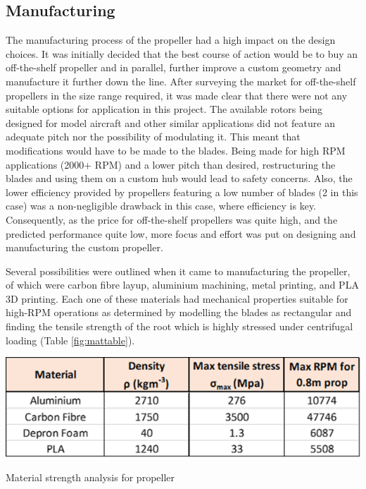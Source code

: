 \subsection{Manufacturing}

The manufacturing process of the propeller had a high impact on the design choices. It was initially decided that the best course of action would be to buy an off-the-shelf propeller and in parallel, further improve a custom geometry and manufacture it further down the line. After surveying the market for off-the-shelf propellers in the size range required, it was made clear that there were not any suitable options for application in this project. The available rotors being designed for model aircraft and other similar applications did not feature an adequate pitch nor the possibility of modulating it. This meant that modifications would have to be made to the blades. Being made for high RPM applications (2000+ RPM) and a lower pitch than desired, restructuring the blades and using them on a custom hub would lead to safety concerns. Also, the lower efficiency provided by propellers featuring a low number of blades (2 in this case) was a non-negligible drawback in this case, where efficiency is key. Consequently, as the price for off-the-shelf propellers was quite high, and the predicted performance quite low, more focus and effort was put on designing and manufacturing the custom propeller.

Several possibilities were outlined when it came to manufacturing the propeller, of which were carbon fibre layup, aluminium machining, metal printing, and PLA 3D printing. Each one of these materials had mechanical properties suitable for high-RPM operations as determined by modelling the blades as rectangular and finding the tensile strength of the root which is highly stressed under centrifugal loading (Table \ref{fig:mattable}).

\begin{table}[!htbp]
    \centering
    \includegraphics{images/part6/materialstable.png}
    \caption{Material strength analysis for propeller}
    \label{fig:mattable}
\end{table}

